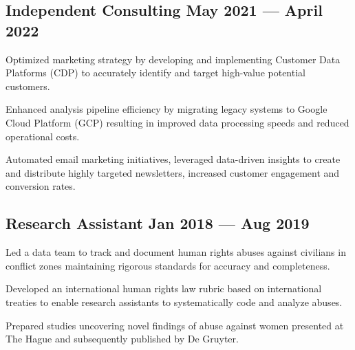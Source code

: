 \documentclass[singlesided, paper=a4, fontsize=10.5pt]{testing-class}
\begin{document}
{    \subsection{Independent Consulting \hfill May 2021 --- April 2022}
    \begin{zitemize}
        \item Optimized marketing strategy by developing and implementing Customer Data Platforms (CDP) to accurately identify and target high-value potential customers.
        \item Enhanced analysis pipeline efficiency by migrating legacy systems to Google Cloud Platform (GCP) resulting in improved data processing speeds and reduced operational costs.
        \item Automated email marketing initiatives, leveraged data-driven insights to create and distribute highly targeted newsletters, increased customer engagement and conversion rates.
    \end{zitemize}

    \subsection{Research Assistant \hfill Jan 2018 --- Aug 2019}
    \begin{zitemize}
        \item Led a data team to track and document human rights abuses against civilians in conflict zones maintaining rigorous standards for accuracy and completeness.
        \item Developed an international human rights law rubric based on international treaties to enable research assistants to systematically code and analyze abuses.
        \item Prepared studies uncovering novel findings of abuse against women presented at The Hague and subsequently published by De Gruyter.

    \end{zitemize}




}
\end{document}
